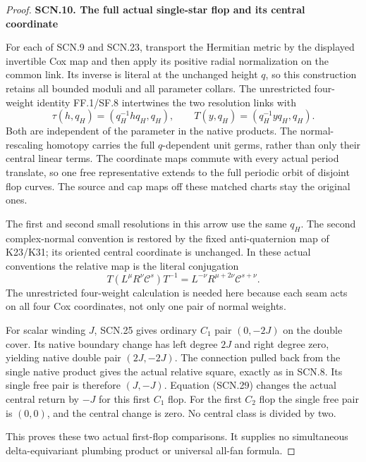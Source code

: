 \begin{proof}
\par

\medskip\noindent\textbf{SCN.10. The full actual single-star flop and its central coordinate}

\par\nobreak

For each of SCN.9 and SCN.23, transport the Hermitian
metric by the displayed invertible Cox map and then
apply its positive radial normalization on the common
link. Its inverse is literal at the unchanged height
\(q\), so this construction retains all bounded
moduli and all parameter collars. The unrestricted
four-weight identity FF.1/SF.8 intertwines the two
resolution links with
\[
  \tau(h,q_H)=(q_H^{-1}h q_H,q_H),\qquad
  T(y,q_H)=(q_H^{-1}yq_H,q_H).                         \tag{SCN.28}
\]
Both are independent of the parameter in the native
products. The normal-rescaling homotopy carries the
full \(q\)-dependent unit germs, rather than only
their central linear terms. The coordinate maps
commute with every actual period translate, so one
free representative extends to the full periodic
orbit of disjoint flop curves. The source and cap
maps off these matched charts stay the original ones.

The first and second small resolutions in this arrow
use the same \(q_H\). The second complex-normal
convention is restored by the fixed anti-quaternion
map of K23/K31; its oriented central coordinate is
unchanged. In these actual conventions the relative
map is the literal conjugation
\[
 T(L^\mu R^\nu\mathcal C^s)T^{-1}
          =L^{-\nu}R^{\mu+2\nu}\mathcal C^{s+\nu}.
                                                        \tag{SCN.29}
\]
The unrestricted four-weight calculation is needed
here because each seam acts on all four Cox
coordinates, not only one pair of normal weights.

For scalar winding \(J\), SCN.25 gives ordinary
\(C_1\) pair \((0,-2J)\) on the double cover. Its
native boundary change has left degree \(2J\) and
right degree zero, yielding native double pair
\((2J,-2J)\). The connection pulled back from the
single native product gives the actual relative
square, exactly as in SCN.8. Its single free pair
is therefore \((J,-J)\). Equation (SCN.29) changes
the actual central return by \(-J\) for this first
\(C_1\) flop. For the first \(C_2\) flop the single
free pair is \((0,0)\), and the central change is
zero. No central class is divided by two.

This proves these two actual first-flop comparisons. It supplies
no simultaneous delta-equivariant plumbing product or universal
all-fan formula.
\end{proof}
